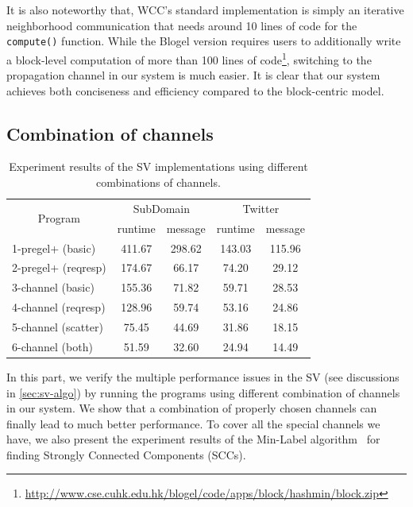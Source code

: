 \documentclass{sokendai_thesis} %
\begin{document}
It is also noteworthy that, WCC's standard implementation is simply an iterative neighborhood communication that needs around 10 lines of code for the \texttt{compute()} function.
While the Blogel version requires users to additionally write a block-level computation of more than 100 lines of code\footnote{\small\url{http://www.cse.cuhk.edu.hk/blogel/code/apps/block/hashmin/block.zip}}, switching to the propagation channel in our system is much easier.
It is clear that our system achieves both conciseness and efficiency compared to the block-centric model.

\subsection{Combination of channels}
\label{sec:eval-comb}

\begin{table}[t]
\centering
\caption{Experiment results of the SV implementations using different combinations of channels.}
\label{tab:sv-results}
\begin{tabular}{l|c|c|c|c}
\hline
\multicolumn{1}{c}{\multirow{2}{*}{Program}} & \multicolumn{2}{|c}{SubDomain} & \multicolumn{2}{|c}{Twitter} \\
\cline{2-5}
& \small runtime & \small message & \small runtime & \small message \\
\hline\hline
1-pregel+ (basic) & 411.67 & 298.62  & 143.03 & 115.96  \\
\hline
2-pregel+ (reqresp) & 174.67 & 66.17  & 74.20 & 29.12  \\
\hline
3-channel (basic) & 155.36 & 71.82  & 59.71 & 28.53  \\
\hline
4-channel (reqresp) & 128.96 & 59.74  & 53.16 & 24.86  \\
\hline
5-channel (scatter) & 75.45 & 44.69  & 31.86 & 18.15  \\
\hline
6-channel (both) & 51.59 & 32.60  & 24.94 & 14.49  \\
\hline
\end{tabular}
\end{table}

In this part, we verify the multiple performance issues in the SV (see discussions in \autoref{sec:sv-algo}) by running the programs using different combination of channels in our system.
We show that a combination of properly chosen channels can finally lead to much better performance.
To cover all the special channels we have,
we also present the experiment results of the Min-Label algorithm~\cite{yan2015effective} for finding Strongly Connected Components (SCCs).
\end{document}
